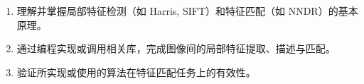 \begin{enumerate}
    \item 理解并掌握局部特征检测（如 Harris, SIFT）和特征匹配（如 NNDR）的基本原理。
    \item 通过编程实现或调用相关库，完成图像间的局部特征提取、描述与匹配。
    \item 验证所实现或使用的算法在特征匹配任务上的有效性。
\end{enumerate}
